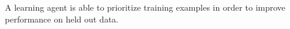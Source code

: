 \documentclass[preview]{standalone}
\begin{document}
\begin{center}
A learning agent is able to prioritize training examples in order to improve performance on held out data.
\end{center}
\end{document}
